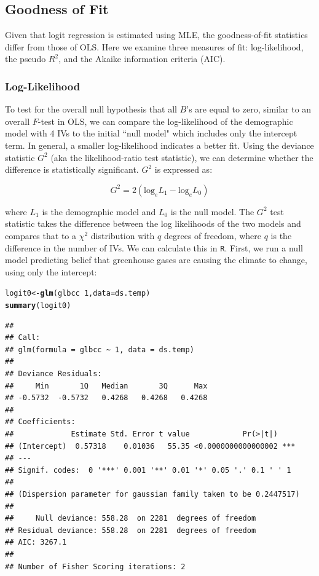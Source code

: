 \documentclass[11pt,openany]{book}\usepackage[]{graphicx}\usepackage[]{color}
\makeatletter
\newcommand{\hlnum}[1]{\textcolor[rgb]{0.686,0.059,0.569}{#1}}%
\newcommand{\hlopt}[1]{\textcolor[rgb]{0,0,0}{#1}}%
\newcommand{\hlstd}[1]{\textcolor[rgb]{0.345,0.345,0.345}{#1}}%
\newcommand{\hlkwb}[1]{\textcolor[rgb]{0.69,0.353,0.396}{#1}}%
\newcommand{\hlkwc}[1]{\textcolor[rgb]{0.333,0.667,0.333}{#1}}%
\newcommand{\hlkwd}[1]{\textcolor[rgb]{0.737,0.353,0.396}{\textbf{#1}}}%
\newenvironment{kframe}{%
 \def\at@end@of@kframe{}%
 \ifinner\ifhmode%
  \def\at@end@of@kframe{\end{minipage}}%
  \begin{minipage}{\columnwidth}%
 \fi\fi%
 \def\FrameCommand##1{\hskip\@totalleftmargin \hskip-\fboxsep
 \colorbox{shadecolor}{##1}\hskip-\fboxsep
     \hskip-\linewidth \hskip-\@totalleftmargin \hskip\columnwidth}%
 \MakeFramed {\advance\hsize-\width
   \@totalleftmargin\z@ \linewidth\hsize
   \@setminipage}}%
 {\par\unskip\endMakeFramed%
 \at@end@of@kframe}
\newenvironment{knitrout}{}{} %
\renewenvironment{knitrout}{\begin{singlespace}}{\end{singlespace}} %
\makeatother
\begin{document}
\subsection{Goodness of Fit} 

Given that logit regression is estimated using MLE, the goodness-of-fit statistics differ from those of OLS. Here we examine three
measures of fit: log-likelihood, the pseudo $R^2$, and the Akaike information criteria (AIC). 

\subsubsection{Log-Likelihood}
To test for the overall null hypothesis that all $B$’s are equal to zero, similar to an overall $F$-test in OLS, we can compare the log-likelihood of the demographic model with 4 IVs to the initial ``null model" which includes only the intercept term. In general, a smaller log-likelihood indicates a better fit. Using the deviance statistic $G^2$ (aka the likelihood-ratio test statistic), we can determine whether the difference
is statistically significant. $G^2$ is expressed as: 

 \begin{equation}
   \label{eq:G}
   G^2 = 2(\text{log}_e L_1 - \text{log}_e L_0)
\end{equation}

\noindent where $L_1$ is the demographic model and $L_0$ is the null model. The $G^2$ test statistic takes the difference between the log likelihoods of the two models and compares that to a $\chi^2$ distribution with $q$ degrees of freedom, where $q$ is the difference in the number of IVs. We can calculate this in \texttt{R}.  First, we run a null model predicting belief that greenhouse gases are causing the climate to change, using only
the intercept:

\begin{knitrout}
\color{fgcolor}\begin{kframe}
\begin{alltt}
\hlstd{logit0} \hlkwb{<-} \hlkwd{glm}\hlstd{(glbcc} \hlopt{~} \hlnum{1}\hlstd{,} \hlkwc{data} \hlstd{= ds.temp)}
\hlkwd{summary}\hlstd{(logit0)}
\end{alltt}
\begin{verbatim}
## 
## Call:
## glm(formula = glbcc ~ 1, data = ds.temp)
## 
## Deviance Residuals: 
##     Min       1Q   Median       3Q      Max  
## -0.5732  -0.5732   0.4268   0.4268   0.4268  
## 
## Coefficients:
##             Estimate Std. Error t value            Pr(>|t|)    
## (Intercept)  0.57318    0.01036   55.35 <0.0000000000000002 ***
## ---
## Signif. codes:  0 '***' 0.001 '**' 0.01 '*' 0.05 '.' 0.1 ' ' 1
## 
## (Dispersion parameter for gaussian family taken to be 0.2447517)
## 
##     Null deviance: 558.28  on 2281  degrees of freedom
## Residual deviance: 558.28  on 2281  degrees of freedom
## AIC: 3267.1
## 
## Number of Fisher Scoring iterations: 2
\end{verbatim}
\end{kframe}
\end{knitrout}
\end{document}
